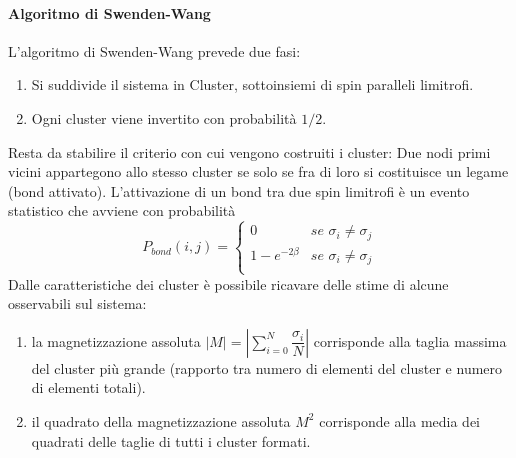 \paragraph{Algoritmo di Swenden-Wang}
L'algoritmo di Swenden-Wang prevede due fasi:
\begin{enumerate}
\item Si suddivide il sistema in Cluster, sottoinsiemi di spin paralleli limitrofi.
\item Ogni cluster viene invertito con probabilità $1/2$.
\end{enumerate}
\medskip Resta da stabilire il criterio con cui vengono costruiti i cluster:
\newline
Due nodi primi vicini appartegono allo stesso cluster se solo se fra di loro si costituisce un legame (bond attivato). L'attivazione di un bond tra due spin limitrofi è un evento statistico che avviene con probabilità
\begin{equation}
P_{bond}(i,j) = \begin{cases}
				0 & \textit{se } \sigma_i \neq \sigma_j \\
				1 - e^{-2\beta} & \textit{se } \sigma_i \neq \sigma_j \\
				\end{cases}
\end{equation}
\medskip Dalle caratteristiche dei cluster è possibile ricavare delle stime di alcune osservabili sul sistema:
\begin{enumerate}
\item la magnetizzazione assoluta $|M|= |\sum_{i=0}^{N}\dfrac{\sigma_i}{N}|$ corrisponde alla taglia massima del cluster più grande (rapporto tra numero di elementi del cluster e numero di elementi totali).
\item il quadrato della magnetizzazione assoluta $M^2$ corrisponde alla media dei quadrati delle taglie di tutti i cluster formati.
\end{enumerate}


